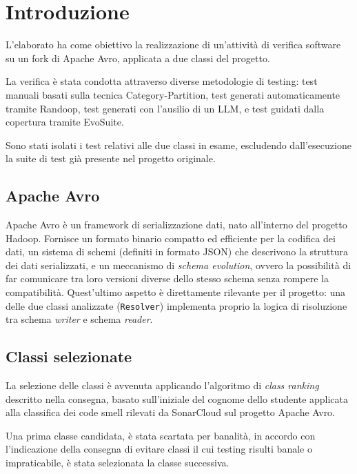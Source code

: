 \section{Introduzione}

L'elaborato ha come obiettivo la realizzazione di un'attività di verifica
software su un fork di Apache Avro, applicata a due classi del progetto.

La verifica è stata condotta attraverso diverse metodologie di testing:
test manuali basati sulla tecnica Category-Partition, test generati
automaticamente tramite Randoop, test generati con l'ausilio di un LLM,
e test guidati dalla copertura tramite EvoSuite.

Sono stati isolati i test relativi alle due classi in esame, escludendo
dall'esecuzione la suite di test già presente nel progetto originale.

\subsection{Apache Avro}

Apache Avro è un framework di serializzazione dati, nato all'interno del
progetto Hadoop. Fornisce un formato binario compatto ed efficiente per
la codifica dei dati, un sistema di schemi (definiti in formato JSON) che
descrivono la struttura dei dati serializzati, e un meccanismo di
\emph{schema evolution}, ovvero la possibilità di far comunicare tra loro
versioni diverse dello stesso schema senza rompere la compatibilità.
Quest'ultimo aspetto è direttamente rilevante per il progetto: una delle
due classi analizzate (\texttt{Resolver}) implementa proprio la logica di
risoluzione tra schema \emph{writer} e schema \emph{reader}.

\subsection{Classi selezionate}

La selezione delle classi è avvenuta applicando l'algoritmo di
\emph{class ranking} descritto nella consegna, basato sull'iniziale del
cognome dello studente applicata alla classifica dei code smell rilevati
da SonarCloud sul progetto Apache Avro.

Una prima classe candidata, è stata scartata per banalità, in accordo con l'indicazione della consegna di evitare
classi il cui testing risulti banale o impraticabile, è stata selezionata la classe successiva.

